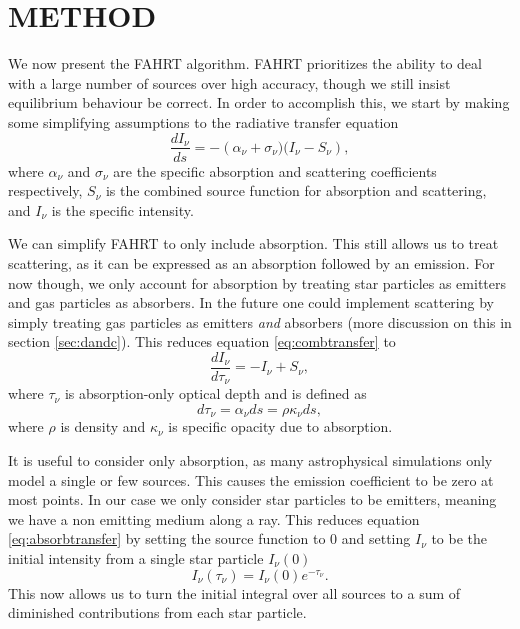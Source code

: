\documentclass[fleqn,usenatbib]{mnras}
\newcommand{\acro}{FAHRT}
\begin{document}
\section{METHOD}\label{sec:method}
We now present the \acro{} algorithm. \acro{} prioritizes the ability to deal 
with a large number of sources over high accuracy, though we still insist 
equilibrium behaviour be correct. In order to accomplish this, we start by 
making some simplifying assumptions to the radiative transfer equation
\begin{equation}
\label{eq:combtransfer}
\frac{dI_\nu}{ds} = -\left(\alpha_\nu + \sigma_\nu)(I_\nu - S_\nu\right),
\end{equation}
where $\alpha_\nu$ and $\sigma_\nu$ are the specific absorption and scattering 
coefficients respectively, $S_\nu$ is the combined source function for 
absorption and scattering, and $I_\nu$ is the specific intensity.

We can simplify \acro{} to only include absorption. This still allows us
to treat scattering, as it can be expressed as an absorption followed by an 
emission. For now though, we only account for absorption by treating star 
particles as emitters and gas particles as absorbers. In the future one could 
implement scattering by simply treating gas particles as emitters \textit{and}
absorbers (more discussion on this in section \ref{sec:dandc}). This reduces 
equation \ref{eq:combtransfer} to
\begin{equation}
\label{eq:absorbtransfer}
\frac{dI_\nu}{d\tau_\nu} = -I_\nu + S_\nu,
\end{equation}
where $\tau_\nu$ is absorption-only optical depth and is defined as
\begin{equation}
\label{eq:tau}
d\tau_\nu = \alpha_\nu ds = \rho \kappa_\nu ds,
\end{equation}
where $\rho$ is density and $\kappa_\nu$ is specific opacity due to absorption.

It is useful to consider only absorption, as many astrophysical simulations 
only model a single or few sources. This causes the emission coefficient to be 
zero at most points. In our case we only consider star particles to be emitters,
 meaning we have a non emitting medium along a ray. This reduces equation 
\ref{eq:absorbtransfer} by setting the source function to 0 and setting 
$I_\nu$ to be the initial intensity from a single star particle $I_\nu(0)$ 
\begin{equation}
\label{eq:absorbsoln}
I_\nu(\tau_\nu) = I_\nu(0)e^{-\tau_\nu}.
\end{equation}
This now allows us to turn the initial integral over all sources to a sum of
diminished contributions from each star particle.
\end{document}

